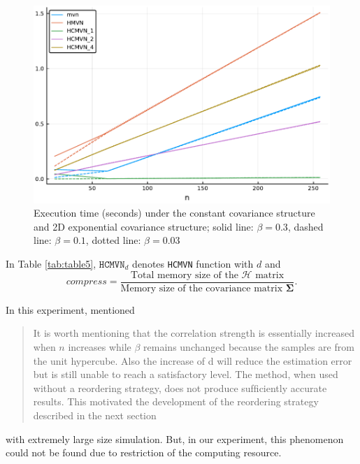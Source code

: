 \begin{figure}
	\centering
	\includegraphics[width=\linewidth]{figs/table5_time.pdf}
	\caption{Execution time (seconds) under the constant covariance structure and 2D exponential covariance structure; solid line: $\beta=0.3$, dashed line: $\beta=0.1$, dotted line: $\beta=0.03$}\label{fig:table5_time}
\end{figure}

In Table \ref{tab:table5}, $\texttt{HCMVN}_d$ denotes \texttt{HCMVN} function with $d$ and  
$$compress = \frac{\text{Total memory size of the } \mathcal{H} \text{ matrix}}{\text{Memory size of the covariance matrix } \boldsymbol{\Sigma}}.$$ 

In this experiment, \citet{cao2019hierarchical} mentioned 
\begin{quote}
	It is worth mentioning that the correlation strength is essentially increased when $n$ increases while $\beta$ remains unchanged because the samples are from the unit hypercube. Also the increase of d will reduce the estimation error but is still unable to reach a satisfactory level. The method, when used without a reordering strategy, does not produce sufﬁciently accurate results. This motivated the development of the reordering strategy described in the next section
\end{quote}
with extremely large size simulation. But, in our experiment, this phenomenon could not be found due to restriction of the computing resource.

